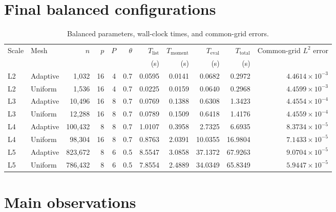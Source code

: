 \documentclass[11pt,a4paper]{article}
\begin{document}
\section{Final balanced configurations}

\begin{landscape}
\begin{table}[p]
\centering
\caption{Balanced parameters, wall-clock times, and common-grid errors.}
\label{tab:balanced-parameters}
\scriptsize
\setlength{\tabcolsep}{3.7pt}
\begin{tabular}{llrrrrrrrrr}
\toprule
Scale & Mesh & $n$ & $p$ & $P$ & $\theta$
& $T_{\mathrm{list}}$ & $T_{\mathrm{moment}}$
& $T_{\mathrm{eval}}$ & $T_{\mathrm{total}}$
& Common-grid $L^2$ error \\
& & & & & & (s) & (s) & (s) & (s) & \\
\midrule
L2 & Adaptive & 1,032   & 16 & 4 & 0.7 & 0.0595 & 0.0141 & 0.0682 & 0.2972 & $4.4614\times10^{-3}$ \\
L2 & Uniform  & 1,536   & 16 & 4 & 0.7 & 0.0225 & 0.0159 & 0.0640 & 0.2968 & $4.4599\times10^{-3}$ \\
L3 & Adaptive & 10,496  & 16 & 8 & 0.7 & 0.0769 & 0.1388 & 0.6308 & 1.3423 & $4.4554\times10^{-4}$ \\
L3 & Uniform  & 12,288  & 16 & 8 & 0.7 & 0.0789 & 0.1509 & 0.6418 & 1.4176 & $4.4559\times10^{-4}$ \\
L4 & Adaptive & 100,432 & 8  & 8 & 0.7 & 1.0107 & 0.3958 & 2.7325 & 6.6935 & $8.3734\times10^{-5}$ \\
L4 & Uniform  & 98,304  & 16 & 8 & 0.7 & 0.8763 & 2.0391 & 10.0355 & 16.9804 & $7.1433\times10^{-5}$ \\
L5 & Adaptive & 823,672 & 8  & 6 & 0.5 & 8.5547 & 3.0858 & 37.1372 & 67.9263 & $9.0704\times10^{-5}$ \\
L5 & Uniform  & 786,432 & 8  & 6 & 0.5 & 7.8554 & 2.4889 & 34.0349 & 65.8349 & $5.9447\times10^{-5}$ \\
\bottomrule
\end{tabular}
\end{table}
\end{landscape}

\section{Main observations}
\end{document}
